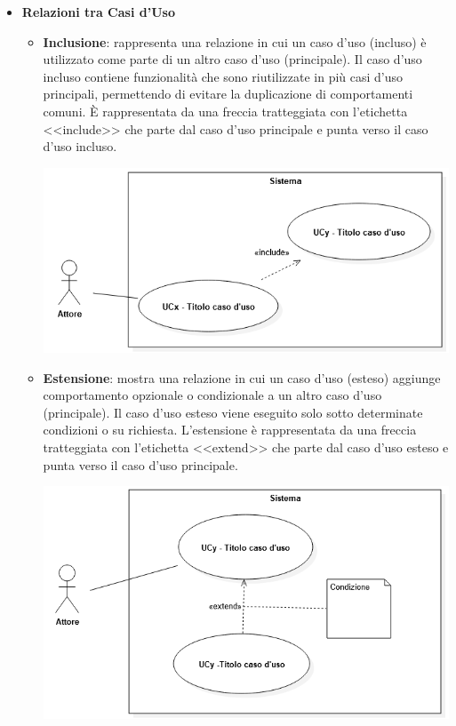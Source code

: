 \begin{itemize}
	\item \textbf{Relazioni tra Casi d'Uso}
	    \begin{itemize}
		    \item \textbf{Inclusione}: rappresenta una relazione in cui un caso d'uso (incluso) è utilizzato come parte di un altro caso d'uso (principale). Il caso d'uso incluso contiene funzionalità che sono riutilizzate in più casi d'uso principali, permettendo di evitare la duplicazione di comportamenti comuni. È rappresentata da una freccia tratteggiata con l'etichetta <<include>> che parte dal caso d'uso principale e punta verso il caso d'uso incluso.
				\begin{center}
					\includegraphics*[width=15cm]{../../../images/norme_di_progetto/inclusione.png}
				\end{center} 
		\newpage
		    \item \textbf{Estensione}: mostra una relazione in cui un caso d'uso (esteso) aggiunge comportamento opzionale o condizionale a un altro caso d'uso (principale). Il caso d'uso esteso viene eseguito solo sotto determinate condizioni o su richiesta. L'estensione è rappresentata da una freccia tratteggiata con l'etichetta <<extend>> che parte dal caso d'uso esteso e punta verso il caso d'uso principale.
				\begin{center}
					\includegraphics*[width=15cm]{../../../images/norme_di_progetto/estensione.png}

\end{center}
\end{itemize}
\end{itemize}
